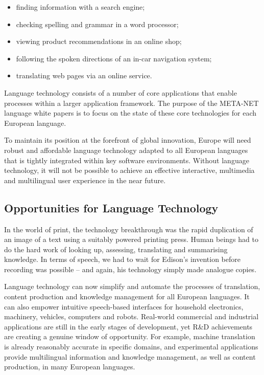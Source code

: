 \begin{multicols}{2}
\begin{itemize}
\item finding information with a search engine;
\item checking spelling and grammar in a word processor;
\item viewing product recommendations in an online shop;
\item following the spoken directions of an in-car navigation system;
\item translating web pages via an online service.
\end{itemize}

Language technology consists of a number of core applications that enable processes within a larger application framework. The purpose of the META-NET language white papers is to focus on the state of these core technologies for each European language.


To maintain its position at the forefront of global innovation, Europe will need robust and affordable language technology adapted to all European languages that is tightly integrated within key software environments. Without language technology, it will not be possible to achieve an effective interactive, multimedia and multilingual user experience in the near future.

\subsection{Opportunities for Language Technology}

In the world of print, the technology breakthrough was the rapid duplication of an image of a text using a suitably powered printing press. Human beings had to do the hard work of looking up, assessing, translating and summarising knowledge. In terms of speech, we had to wait for Edison’s invention before recording was possible -- and again, his technology simply made analogue copies.

Language technology can now simplify and automate the processes of translation, content production and knowledge management for all European languages. It can also empower intuitive speech-based interfaces for household electronics, machinery, vehicles, computers and robots. Real-world commercial and industrial applications are still in the early stages of development, yet R\&D achievements are creating a genuine window of opportunity. For example, machine translation is already reasonably accurate in specific domains, and experimental applications provide multilingual information and knowledge management, as well as content production, in many European languages.


\end{multicols}
